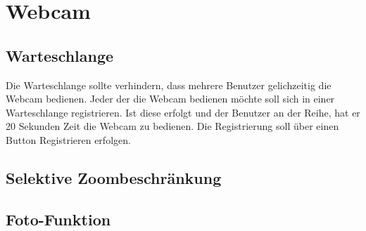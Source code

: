 \section{Webcam}


\subsection{Warteschlange}
Die Warteschlange sollte verhindern, dass mehrere Benutzer gelichzeitig die Webcam bedienen. Jeder der die Webcam bedienen möchte soll sich in einer Warteschlange registrieren. Ist diese erfolgt und der Benutzer an der Reihe, hat er 20 Sekunden Zeit die Webcam zu bedienen. Die Registrierung soll über einen Button Registrieren erfolgen. 


\subsection{Selektive Zoombeschränkung}



\subsection{Foto-Funktion}
